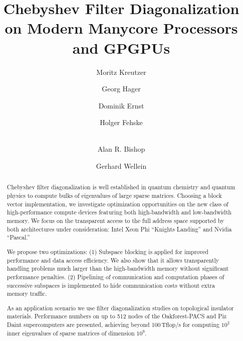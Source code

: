 \documentclass[letterpaper]{llncs}
\newcommand{\OFP}{Oakforest-PACS\xspace}
\newcommand{\second}{\mbox{s}\xspace}
\newcommand{\flop}{\mbox{flop}\xspace}
\newcommand{\TFS}{\mbox{T\flop/\second}\xspace}
\begin{document}
\title{Chebyshev Filter Diagonalization on Modern Manycore Processors and GPGPUs}
\author{Moritz Kreutzer \and Georg Hager \and Dominik
  Ernst \and Holger Fehske\and\\ Alan
  R. Bishop \and Gerhard Wellein} 
\maketitle
\begin{abstract}

  Chebyshev filter diagonalization is well established in
  quantum chemistry and quantum physics to compute bulks of
  eigenvalues of large sparse matrices. Choosing a block vector
  implementation, we investigate optimization
  opportunities on the new class of high-performance compute devices
  featuring both high-bandwidth and low-bandwidth memory. We focus on
  the transparent access to the full address space supported by both
  architectures under consideration: Intel Xeon Phi ``Knights
  Landing'' and Nvidia ``Pascal.''
 
  We propose two optimizations: (1) Subspace blocking is applied for
  improved performance and data access efficiency.  We also show that
  it allows transparently handling problems much larger than the
  high-bandwidth memory without significant performance penalties. (2)
  Pipelining of communication and computation phases of successive
  subspaces is implemented to hide communication costs without extra
  memory traffic.
  
  As an application scenario we use filter diagonalization studies
  on topological insulator materials.
  Performance numbers on up to 512 nodes of the \OFP and Piz Daint
  supercomputers are presented, achieving beyond 100\,\TFS
  for computing $10^2$ inner eigenvalues of sparse matrices of
  dimension $10^9$.
  
\end{abstract}

%
%
\end{document}
